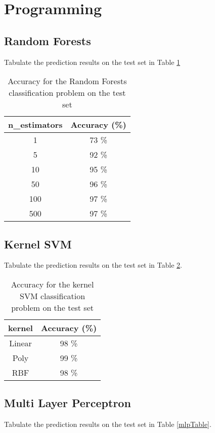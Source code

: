\section{Programming }

\subsection{Random Forests}

Tabulate the prediction results on the test set in Table \ref{rfTable}

\begin{table}[H]
\centering
\begin{tabular}{ |c|c| } 
 \hline
 \textbf{n\_estimators} & \textbf{Accuracy (\%)} \\
 \hline
 1 & 73 \% \\ 
 5 & 92 \% \\ 
 10 & 95 \% \\
 50 & 96 \%\\ 
 100 & 97 \%\\ 
 500 & 97 \%\\
 \hline
\end{tabular}
\caption{Accuracy for the Random Forests classification problem on the test set}
\label{rfTable}
\end{table}

\subsection{Kernel SVM}

Tabulate the prediction results on the test set in Table \ref{ksvmTable}.
\begin{table}[H]
\centering
\begin{tabular}{ |c|c| } 
 \hline
 \textbf{kernel} & \textbf{Accuracy (\%)} \\
 \hline
 Linear & 98 \% \\ 
 Poly & 99 \% \\
 RBF & 98 \%\\ 
 \hline
\end{tabular}
\caption{Accuracy for the kernel SVM classification problem on the test set}
\label{ksvmTable}
\end{table}

\subsection{Multi Layer Perceptron}

Tabulate the prediction results on the test set in Table \ref{mlpTable}.

